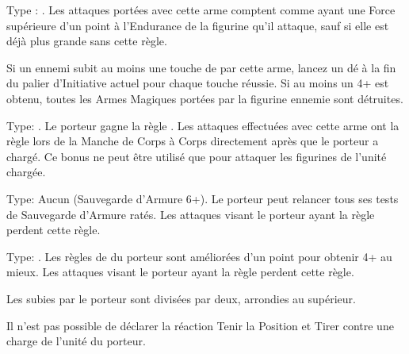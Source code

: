 \closearmynewsection






\startarmymagicalitems

\armymagicalweapons

\startpricelist

 Type : \hw{}. Les attaques portées avec cette arme comptent comme ayant une Force supérieure d'un point à l'Endurance de la figurine qu'il attaque, sauf si elle est déjà plus grande sans cette règle.

Si un ennemi subit au moins une touche de par cette arme, lancez un dé à la fin du palier d'Initiative actuel pour chaque touche réussie. Si au moins un 4+ est obtenu, toutes les Armes Magiques portées par la figurine ennemie sont détruites.

 Type: \lance{}. Le porteur gagne la règle . Les attaques effectuées avec cette arme ont la règle  lors de la Manche de Corps à Corps directement après que le porteur a chargé. Ce bonus ne peut être utilisé que pour attaquer les figurines de l'unité chargée.

\endpricelist

\armymagicalarmour

\startpricelist

 Type: Aucun (Sauvegarde d'Armure 6+). Le porteur peut relancer tous ses tests de Sauvegarde d'Armure ratés. Les attaques visant le porteur ayant la règle  perdent cette règle.

 Type: \ha{}. Les règles de \wardsave{} du porteur sont améliorées d'un point pour obtenir 4+ au mieux. Les attaques visant le porteur ayant la règle \holyattacks{} perdent cette règle.

\endpricelist

\armytalismans

\startpricelistNSP

 Les \multiplewounds{}{} subies par le porteur sont divisées par deux, arrondies au supérieur.

\columnbreak

\vspace*{0.9cm}
 Il n'est pas possible de déclarer la réaction Tenir la Position et Tirer contre une charge de l'unité du porteur.

